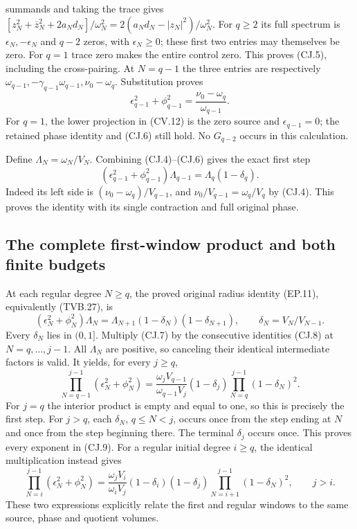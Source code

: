 \documentclass[11pt,a4paper]{article}
\begin{document}
summands and taking the trace gives
$[z_N^2+\overline z_N^2+2a_Nd_N]/\omega_N^2
=2(a_Nd_N-|z_N|^2)/\omega_N^2$.
For $q\ge2$ its full spectrum is $\epsilon_N,-\epsilon_N$
and $q-2$ zeros, with $\epsilon_N\ge0$; these first two
entries may themselves be zero. For $q=1$ trace zero makes
the entire control zero. This proves (CJ.5), including the cross-pairing.
At $N=q-1$ the three entries are respectively
$\omega_{q-1},-\gamma_{q-1}\omega_{q-1},\nu_0-\omega_q$.
Substitution proves
\[
 \epsilon_{q-1}^2+\phi_{q-1}^2
 =\frac{\nu_0-\omega_q}{\omega_{q-1}}.
 \tag{CJ.6}
\]
For $q=1$, the lower projection in (CV.12) is the zero source
and $\epsilon_{q-1}=0$; the retained phase identity and (CJ.6)
still hold. No $G_{q-2}$ occurs in this calculation.

Define $\Lambda_N=\omega_N/V_N$. Combining (CJ.4)--(CJ.6)
gives the exact first step
\[
 (\epsilon_{q-1}^2+\phi_{q-1}^2)\Lambda_{q-1}
      =\Lambda_q(1-\delta_q).
 \tag{CJ.7}
\]
Indeed its left side is $(\nu_0-\omega_q)/V_{q-1}$, and
$\nu_0/V_{q-1}=\omega_q/V_q$ by (CJ.4). This proves the
identity with its single contraction and full original phase.

\subsection{The complete first-window product and both finite budgets}

At each regular degree $N\ge q$, the proved original radius
identity (EP.11), equivalently (TVB.27), is
\[
 (\epsilon_N^2+\phi_N^2)\Lambda_N
 =\Lambda_{N+1}(1-\delta_N)(1-\delta_{N+1}),
 \qquad \delta_N=V_N/V_{N-1}.
 \tag{CJ.8}
\]
Every $\delta_N$ lies in $(0,1]$. Multiply (CJ.7) by the
consecutive identities (CJ.8) at $N=q,\ldots,j-1$.
All $\Lambda_N$ are positive, so canceling their identical
intermediate factors is valid. It yields, for every $j\ge q$,
\[
 \boxed{
 \prod_{N=q-1}^{j-1}(\epsilon_N^2+\phi_N^2)
 =\frac{\omega_jV_{q-1}}{\omega_{q-1}V_j}
       (1-\delta_j)\prod_{N=q}^{j-1}(1-\delta_N)^2.}
 \tag{CJ.9}
\]
For $j=q$ the interior product is empty and equal to one,
so this is precisely the first step. For $j>q$, each
$\delta_N$, $q\le N<j$, occurs once from the step ending at
$N$ and once from the step beginning there. The terminal
$\delta_j$ occurs once. This proves every exponent in (CJ.9).
For a regular initial degree $i\ge q$, the identical multiplication
instead gives
\[
 \prod_{N=i}^{j-1}(\epsilon_N^2+\phi_N^2)
 =\frac{\omega_jV_i}{\omega_iV_j}
       (1-\delta_i)(1-\delta_j)
       \prod_{N=i+1}^{j-1}(1-\delta_N)^2,
 \qquad j>i.
 \tag{CJ.10}
\]
These two expressions explicitly relate the first and regular
windows to the same source, phase and quotient volumes.
\end{document}
